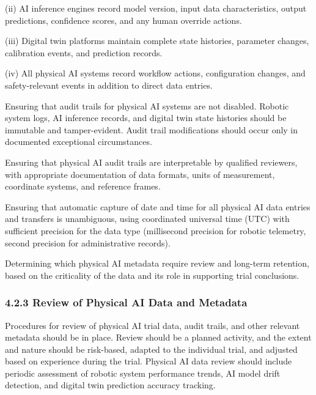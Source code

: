 \documentclass[11pt]{article}
\begin{document}
(ii) AI inference engines record model version, input data characteristics, output predictions, confidence scores, and any human override actions.

(iii) Digital twin platforms maintain complete state histories, parameter changes, calibration events, and prediction records.

(iv) All physical AI systems record workflow actions, configuration changes, and safety-relevant events in addition to direct data entries.

\begin{description}[leftmargin=2.5cm,style=sameline]

\item[(b)] Ensuring that audit trails for physical AI systems are not disabled. Robotic system logs, AI inference records, and digital twin state histories should be immutable and tamper-evident. Audit trail modifications should occur only in documented exceptional circumstances.

\item[(c)] Ensuring that physical AI audit trails are interpretable by qualified reviewers, with appropriate documentation of data formats, units of measurement, coordinate systems, and reference frames.

\item[(d)] Ensuring that automatic capture of date and time for all physical AI data entries and transfers is unambiguous, using coordinated universal time (UTC) with sufficient precision for the data type (millisecond precision for robotic telemetry, second precision for administrative records).

\item[(e)] Determining which physical AI metadata require review and long-term retention, based on the criticality of the data and its role in supporting trial conclusions.

\end{description}

\subsubsection{4.2.3 Review of Physical AI Data and Metadata}

Procedures for review of physical AI trial data, audit trails, and other relevant metadata should be in place. Review should be a planned activity, and the extent and nature should be risk-based, adapted to the individual trial, and adjusted based on experience during the trial. Physical AI data review should include periodic assessment of robotic system performance trends, AI model drift detection, and digital twin prediction accuracy tracking.
\end{document}

